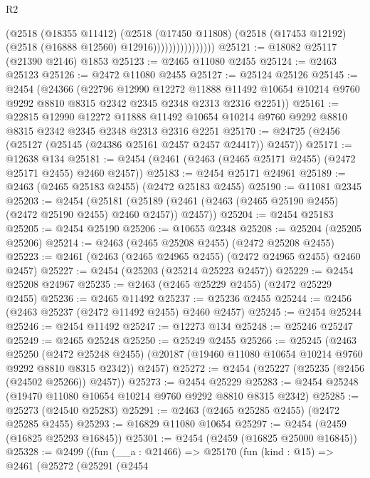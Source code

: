 \begin{lexlean}{R2}
\begin{coremodule}
                            (@2518
                              (@18355 @11412)
                              (@2518
                                (@17450 @11808)
                                (@2518 (@17453 @12192) (@2518 (@16888 @12560) @12916))))))))))))))))
@25121 := @18082 @25117 (@21390 @2146) @1853
@25123 := @2465 @11080 @2455
@25124 := @2463 @25123
@25126 := @2472 @11080 @2455
@25127 := @25124 @25126
@25145 := @2454
    (@24366
      (@22796
        @12990
        @12272
        @11888
        @11492
        @10654
        @10214
        @9760
        @9292
        @8810
        @8315
        @2342
        @2345
        @2348
        @2313
        @2316
        @2251))
@25161 := @22815
    @12990
    @12272
    @11888
    @11492
    @10654
    @10214
    @9760
    @9292
    @8810
    @8315
    @2342
    @2345
    @2348
    @2313
    @2316
    @2251
@25170 := @24725 (@2456 (@25127 (@25145 (@24386 @25161 @2457 @2457 @24417)) @2457))
@25171 := @12638 @134
@25181 := @2454 (@2461 (@2463 (@2465 @25171 @2455) (@2472 @25171 @2455) @2460 @2457))
@25183 := @2454 @25171 @24961
@25189 := @2463 (@2465 @25183 @2455) (@2472 @25183 @2455)
@25190 := @11081 @2345
@25203 := @2454
    (@25181 (@25189 (@2461 (@2463 (@2465 @25190 @2455) (@2472 @25190 @2455) @2460 @2457)) @2457))
@25204 := @2454 @25183
@25205 := @2454 @25190
@25206 := @10655 @2348
@25208 := @25204 (@25205 @25206)
@25214 := @2463 (@2465 @25208 @2455) (@2472 @25208 @2455)
@25223 := @2461 (@2463 (@2465 @24965 @2455) (@2472 @24965 @2455) @2460 @2457)
@25227 := @2454 (@25203 (@25214 @25223 @2457))
@25229 := @2454 @25208 @24967
@25235 := @2463 (@2465 @25229 @2455) (@2472 @25229 @2455)
@25236 := @2465 @11492
@25237 := @25236 @2455
@25244 := @2456 (@2463 @25237 (@2472 @11492 @2455) @2460 @2457)
@25245 := @2454 @25244
@25246 := @2454 @11492
@25247 := @12273 @134
@25248 := @25246 @25247
@25249 := @2465 @25248
@25250 := @25249 @2455
@25266 := @25245
    (@2463
      @25250
      (@2472 @25248 @2455)
      (@20187 (@19460 @11080 @10654 @10214 @9760 @9292 @8810 @8315 @2342))
      @2457)
@25272 := @2454 (@25227 (@25235 (@2456 (@24502 @25266)) @2457))
@25273 := @2454 @25229
@25283 := @2454 @25248 (@19470 @11080 @10654 @10214 @9760 @9292 @8810 @8315 @2342)
@25285 := @25273 (@24540 @25283)
@25291 := @2463 (@2465 @25285 @2455) (@2472 @25285 @2455)
@25293 := @16829 @11080 @10654
@25297 := @2454 (@2459 (@16825 @25293 @16845))
@25301 := @2454 (@2459 (@16825 @25000 @16845))
@25328 := @2499
    ((fun (__a : @21466) =>
    @25170
      (fun (kind : @15) =>
      @2461
        (@25272
          (@25291
            (@2454

\end{coremodule}
\end{lexlean}
